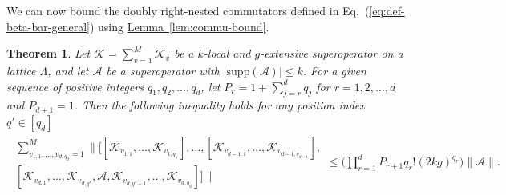 \documentclass[11pt]{article}
\newtheorem{theorem}{Theorem}
\newcommand{\eq}[1]{(\ref{eq:#1})}
\newcommand{\lem}[1]{\hyperref[lem:#1]{Lemma~\ref*{lem:#1}}}
\newcommand{\supp}{\mathrm{supp}}
\newcommand{\mc}{\mathcal}
\begin{document}
We can now bound the doubly right-nested commutators defined in Eq.~\eq{def-beta-bar-general} using \lem{commu-bound}. 
\begin{theorem}\label{thm:doubly-nested-bound}
    Let $\mathcal{K} = \sum_{v=1}^{M} \mathcal{K}_{v}$ be a $k$-local and $g$-extensive superoperator on a lattice $\Lambda$, and let $\mathcal{A}$ be a superoperator with $|\supp(\mc A)|\le k$. For a given sequence of positive integers $q_1, q_2, \ldots, q_d$, let $P_{r} = 1+\sum_{j=r}^{d} q_j$ for $r=1, 2, \ldots, d$ and $P_{d+1}=1$. Then the following inequality holds for any position index $q' \in [q_d]$
    \begin{align}
    \label{eq:double-comm-k-local}
        \begin{multlined}
            \sum_{v_{1,1}, \ldots, v_{d, q_d}=1}^{M} \bigg\| \Big[ [\mathcal{K}_{v_{1,1}}, \ldots, \mathcal{K}_{v_{1, q_1}}], \ldots, [\mathcal{K}_{v_{d-1,1}}, \ldots, \mathcal{K}_{v_{d-1, q_{d-1}}}], \\
        [\mathcal{K}_{v_{d,1}}, \ldots, \mathcal{K}_{v_{d, q'}}, \mathcal{A}, \mathcal{K}_{v_{d, q'+1}}, \ldots, \mathcal{K}_{v_{d, q_d}}] \Big] \bigg\| 
        \end{multlined}\le \bigg(\prod_{r=1}^{d}P_{r+1} q_r!(2kg)^{q_r}\bigg)\|\mc A\|.
    \end{align}
\end{theorem}
\end{document}
